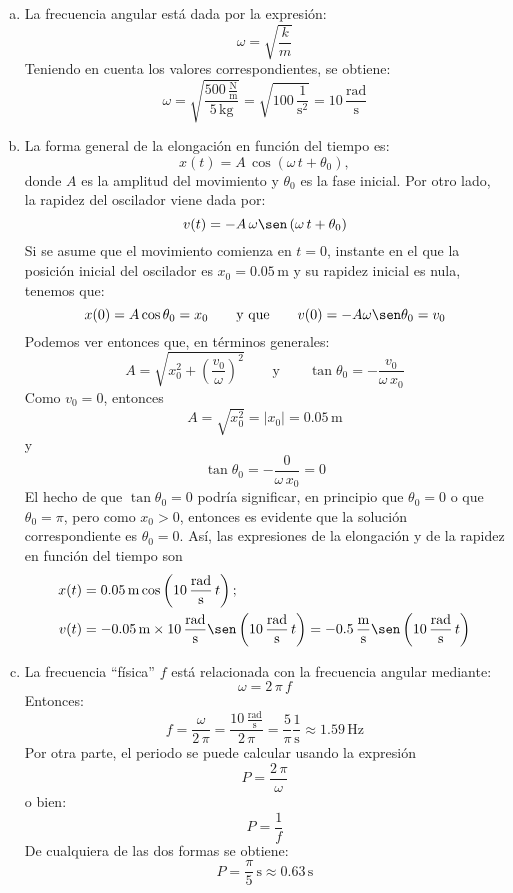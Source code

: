 \documentclass[addpoints]{exam}
\newcommand{\abs}[1]{\left\vert #1 \right\vert}
\begin{document}
\begin{questions}
    \begin{solution}
    \begin{enumerate}[a)]
        \item La frecuencia angular está dada por la expresión: $$\omega = \sqrt{\frac{k}{m}}$$ Teniendo en cuenta los valores correspondientes, se obtiene: $$\omega = \sqrt{\frac{500 \, \frac{\text{N}}{\text{m}}}{5 \, \text{kg}}} = \sqrt{100 \, \frac{1}{\text{s}^2}} = 10 \, \frac{\text{rad}}{\text{s}}$$
        \item La forma general de la elongación en función del tiempo es: $$x(t) = A \, \cos \left(\omega \, t + \theta_0\right),$$ donde $A$ es la amplitud del movimiento y $\theta_0$ es la fase inicial. Por otro lado, la rapidez del oscilador viene dada por: $$v(t) = - A \, \omega \sen \left(\omega \, t + \theta_0\right)$$ Si se asume que el movimiento comienza en $t= 0$, instante en el que la posición inicial del oscilador es $x_0 = 0.05 \, \text{m}$ y su rapidez inicial es nula, tenemos que: $$x(0) = A \cos \theta_0 = x_0 \qquad \text{y que} \qquad v(0) = - A \omega \sen \theta_0 = v_0$$ Podemos ver entonces que, en términos generales: $$A = \sqrt{x_0^2 + \left(\frac{v_0}{\omega}\right)^2} \qquad \text{y} \qquad \tan \theta_0 = - \frac{v_0}{\omega \, x_0}$$ Como $v_0 = 0$, entonces $$A = \sqrt{x_0^2} = \abs{x_0} = 0.05 \, \text{m}$$ y $$\tan \theta_0 = - \frac{0}{\omega \, x_0} = 0$$ El hecho de que $\tan \theta_0 = 0$ podría significar, en principio que $\theta_0 = 0$ o que $\theta_0 = \pi$, pero como $x_0 > 0$, entonces es evidente que la solución correspondiente es $\theta_0 = 0$. Así, las expresiones de la elongación y de la rapidez en función del tiempo son 
        \begin{align*}
        x(t) &= 0.05 \, \text{m} \cos \left(10 \, \frac{\text{rad}}{\text{s}} \, t\right); \\
        v(t) &= - 0.05 \, \text{m} \times 10 \, \frac{\text{rad}}{\text{s}} \sen \left(10 \, \frac{\text{rad}}{\text{s}} \, t\right) = - 0.5 \, \frac{\text{m}}{\text{s}} \sen \left(10 \, \frac{\text{rad}}{\text{s}} \, t\right)
        \end{align*}
        \item La frecuencia ``física'' $f$ está relacionada con la frecuencia angular mediante: $$\omega = 2 \, \pi \, f$$ Entonces: $$f = \frac{\omega}{2 \, \pi} = \frac{10 \, \frac{\text{rad}}{\text{s}}}{2 \, \pi} = \frac{5}{\pi} \frac{1}{\text{s}} \approx 1.59 \, \text{Hz}$$ Por otra parte, el periodo se puede calcular usando la expresión $$P = \frac{2 \, \pi}{\omega}$$ o bien: $$P = \frac{1}{f}$$ De cualquiera de las dos formas se obtiene: $$P = \frac{\pi}{5} \, \text{s} \approx 0.63 \, \text{s}$$

\end{enumerate}
\end{solution}
\end{questions}
\end{document}
